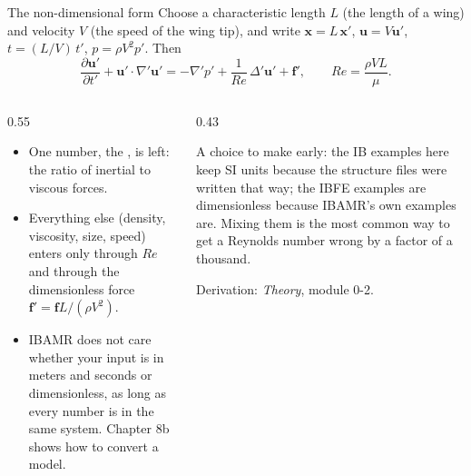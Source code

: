 \documentclass[aspectratio=169,11pt]{beamer}
\begin{document}
\begin{frame}{The non-dimensional form}
Choose a characteristic length $L$ (the length of a wing) and velocity $V$ (the speed of the wing tip), and write $\mathbf{x} = L\,\mathbf{x}'$, $\mathbf{u} = V\mathbf{u}'$, $t = (L/V)\,t'$, $p = \rho V^2 p'$. Then
\[
\frac{\partial \mathbf{u}'}{\partial t'} + \mathbf{u}'\cdot\nabla'\mathbf{u}' = -\nabla' p' + \frac{1}{Re}\,\Delta'\mathbf{u}' + \mathbf{f}', \qquad Re = \frac{\rho V L}{\mu}.
\]
\begin{columns}[T,onlytextwidth]
\begin{column}{0.55\textwidth}
\begin{itemize}
  \item One number, the , is left: the ratio of inertial to viscous forces.
  \item Everything else (density, viscosity, size, speed) enters only through $Re$ and through the dimensionless force $\mathbf{f}' = \mathbf{f} L/(\rho V^2)$.
  \item IBAMR does not care whether your input is in meters and seconds or dimensionless, as long as every number is in the same system. Chapter 8b shows how to convert a model.
\end{itemize}
\end{column}
\begin{column}{0.43\textwidth}
\begin{punchbox}
\small A choice to make early: the IB examples here keep SI units because the structure files were written that way; the IBFE examples are dimensionless because IBAMR's own examples are. Mixing them is the most common way to get a Reynolds number wrong by a factor of a thousand.
\end{punchbox}
\vspace{1mm}
\small Derivation: \emph{Theory}, module 0-2.
\end{column}
\end{columns}
\end{frame}
\end{document}
